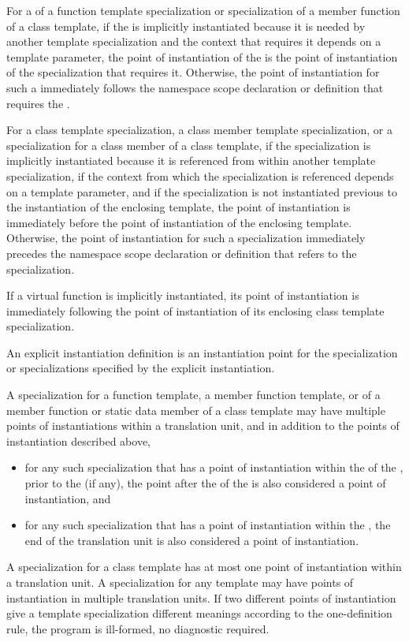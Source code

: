 \pnum
For a  of a function template
specialization or specialization of a member function of a class template, if
the  is implicitly instantiated because
it is needed by another template specialization and the context that requires
it depends on a template parameter, the point of instantiation of the
 is the point of instantiation of the
specialization that requires it. Otherwise, the point of instantiation for such
a  immediately follows the namespace
scope declaration or definition that requires the
.

\pnum
For a class template specialization, a class member template specialization,
or a specialization for a class member of a class template,
if the specialization is implicitly instantiated because it is referenced
from within another template specialization,
if the context from which the specialization is referenced depends on a
template parameter,
and if the specialization is not instantiated previous to the instantiation of
the enclosing template,
the point of instantiation is immediately before the point of instantiation of
the enclosing template.
Otherwise, the point of instantiation for such a specialization immediately
precedes the namespace scope declaration
or definition that refers to the specialization.

\pnum
If a virtual function is implicitly instantiated, its point of instantiation
is immediately following the point of instantiation of its enclosing class
template specialization.

\pnum
An explicit instantiation definition is an instantiation
point for the specialization or specializations specified by the explicit
instantiation.

\pnum
A specialization for a function template, a member function template,
or of a member function or static data member of a class template may have
multiple points of instantiations within a translation unit, and in addition
to the points of instantiation described above,
\begin{itemize}
\item
for any such
specialization that has a point of instantiation within the
 of the
,
prior to the  (if any),
the point after the 
of the 
is also considered a point of instantiation,
and
\item
for any such specialization that has a point of instantiation
within the ,
the end of the translation unit is also
considered a point of instantiation.
\end{itemize}
A specialization for a class template has at most one point of instantiation
within a translation unit.
A specialization for any template may have points of instantiation in multiple
translation units.
If two different points of instantiation give a template specialization
different meanings according to the one-definition rule,
the program is ill-formed, no diagnostic required.

